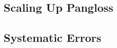 \documentclass[%
 reprint,
 amsmath,amssymb,
 aps,nofootinbib
]{revtex4-1}
\begin{document}


\subsection{Scaling Up Pangloss}



\subsection{Systematic Errors}
\end{document}
